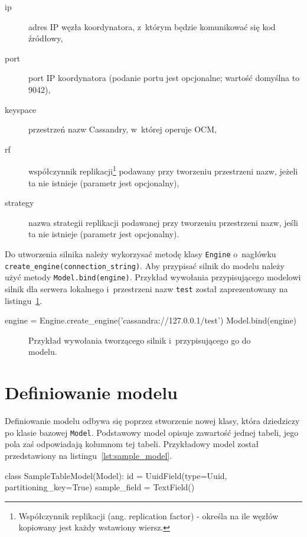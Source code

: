 \begin{description}
	\item[ip] adres IP węzła koordynatora, z~którym będzie komunikować się kod źródłowy,
	\item[port] port IP koordynatora (podanie portu jest opcjonalne; wartość domyślna to 9042),
	\item[keyspace] przestrzeń nazw Cassandry, w~której operuje OCM,
	\item[rf] współczynnik replikacji\footnote{Współczynnik replikacji (ang. replication factor) - określa na ile węzłów kopiowany jest każdy wstawiony wiersz.} podawany przy tworzeniu przestrzeni nazw, jeżeli ta nie istnieje (parametr jest opcjonalny),
	\item[strategy] nazwa strategii replikacji podawanej przy tworzeniu przestrzeni nazw, jeśli ta nie istnieje (parametr jest opcjonalny).
\end{description}

Do utworzenia silnika należy wykorzysać metodę klasy \verb+Engine+ o~nagłówku \verb+create_engine(connection_string)+. Aby przypisać silnik do modelu należy użyć metody \verb+Model.bind(engine)+. Przykład wywołania przypisującego modelowi silnik dla serwera lokalnego i~przestrzeni nazw \verb+test+ został zaprezentowany na listingu~\ref{lst:engine_creation}.

\begin{verbbox}[\footnotesize]
	engine = Engine.create_engine('cassandra://127.0.0.1/test')
	Model.bind(engine)
\end{verbbox}

\begin{figure}[ht!]
	\centering
	\theverbbox
	\caption{Przykład wywołania tworzącego silnik i~przypisującego go do modelu.}
	\label{lst:engine_creation}
\end{figure} 

\section{Definiowanie modelu}
\label{sec:ocm_model_definition}

Definiowanie modelu odbywa się poprzez stworzenie nowej klasy, która dziedziczy po klasie bazowej \verb+Model+. Podstawowy model opisuje zawartość jednej tabeli, jego pola zaś odpowiadają kolumnom tej tabeli. Przykładowy model został przedstawiony na listingu~\ref{lst:sample_model}.

\begin{verbbox}[\footnotesize]
class SampleTableModel(Model):
    id = UuidField(type=Uuid, partitioning_key=True)
    sample_field = TextField()
\end{verbbox}

